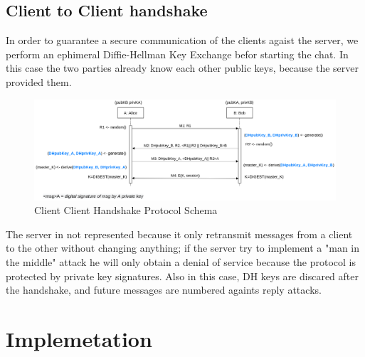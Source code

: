 \documentclass[11pt]{report}
\begin{document}
\section{Client to Client handshake}
In order to guarantee a secure communication of the clients agaist the server, we perform an ephimeral 
Diffie-Hellman Key Exchange befor starting the chat. In this case the two parties already know each other
public keys, because the server provided them. 
\begin{figure}[H]
	\centering
	\includegraphics[scale=0.19]{img/AuthClientClient.png}
	\caption{Client Client Handshake Protocol Schema}
	\label {img: AuthClientClient}
\end{figure}
The server in not represented because it only retransmit messages from a client to the other without changing
anything; if the server try to implement a "man in the middle" attack he will only obtain a denial of service
because the protocol is protected by private key signatures. Also in this case, DH keys are discared after 
the handshake, and future messages are numbered againts reply attacks.



\chapter{Implemetation}
\end{document}

